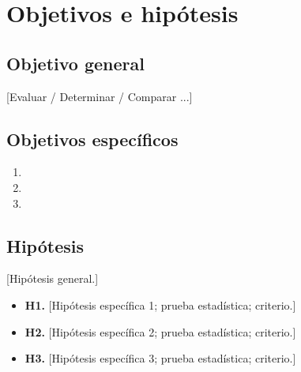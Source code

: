 \section{Objetivos e hipótesis}

\subsection{Objetivo general}
[Evaluar / Determinar / Comparar ...]

\subsection{Objetivos específicos}
\begin{enumerate}
  \item [Comparar ...]
  \item [Determinar ...]
  \item [Evaluar ...]
\end{enumerate}

\subsection{Hipótesis}
[Hipótesis general.]

\begin{itemize}
  \item \textbf{H1.} [Hipótesis específica 1; prueba estadística; criterio.]
  \item \textbf{H2.} [Hipótesis específica 2; prueba estadística; criterio.]
  \item \textbf{H3.} [Hipótesis específica 3; prueba estadística; criterio.]
\end{itemize}
